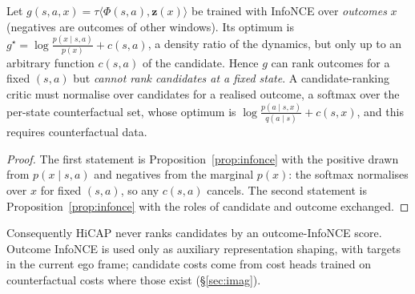\begin{proposition}\label{prop:future}
Let $g(s,a,x)=\tau\langle\Phi(s,a),\mathbf z(x)\rangle$ be trained with InfoNCE over \emph{outcomes} $x$ (negatives are outcomes of other windows). Its optimum is $g^\star=\log\frac{p(x\mid s,a)}{p(x)}+c(s,a)$, a density ratio of the dynamics, but only up to an arbitrary function $c(s,a)$ of the candidate. Hence $g$ can rank outcomes for a fixed $(s,a)$ but \emph{cannot rank candidates at a fixed state}. A candidate-ranking critic must normalise over candidates for a realised outcome, a softmax over the per-state counterfactual set, whose optimum is $\log\frac{p(a\mid s,x)}{q(a\mid s)}+c(s,x)$, and this requires counterfactual data.
\end{proposition}
\begin{proof}
The first statement is Proposition~\ref{prop:infonce} with the positive drawn from $p(x\mid s,a)$ and negatives from the marginal $p(x)$: the softmax normalises over $x$ for fixed $(s,a)$, so any $c(s,a)$ cancels. The second statement is Proposition~\ref{prop:infonce} with the roles of candidate and outcome exchanged.\qedhere
\end{proof}
\noindent Consequently HiCAP never ranks candidates by an outcome-InfoNCE score. Outcome InfoNCE is used only as auxiliary representation shaping, with targets in the current ego frame; candidate costs come from cost heads trained on counterfactual costs where those exist (\S\ref{sec:imag}).

